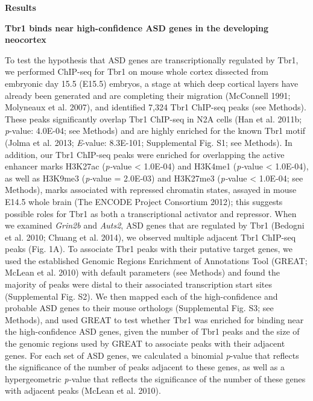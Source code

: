 \documentclass[]{article}
\begin{document}
\textbf{Results}

\textbf{Tbr1 binds near high-confidence ASD genes in the developing
neocortex}

To test the hypothesis that ASD genes are transcriptionally regulated by
Tbr1, we performed ChIP-seq for Tbr1 on mouse whole cortex dissected
from embryonic day 15.5 (E15.5) embryos, a stage at which deep cortical
layers have already been generated and are completing their migration
(McConnell 1991; Molyneaux et al. 2007), and identified 7,324 Tbr1
ChIP-seq peaks (see Methods). These peaks significantly overlap Tbr1
ChIP-seq in N2A cells (Han et al. 2011b; \emph{p}-value: 4.0E-04; see
Methods) and are highly enriched for the known Tbr1 motif (Jolma et al.
2013; \emph{E}-value: 8.3E-101; Supplemental Fig. S1; see Methods). In
addition, our Tbr1 ChIP-seq peaks were enriched for overlapping the
active enhancer marks H3K27ac (\emph{p-}value \textless{} 1.0E-04) and
H3K4me1 (\emph{p-}value \textless{} 1.0E-04), as well as H3K9me3
(\emph{p-}value = 2.0E-03) and H3K27me3 (\emph{p-}value \textless{}
1.0E-04; see Methods), marks associated with repressed chromatin states,
assayed in mouse E14.5 whole brain (The ENCODE Project Consortium 2012);
this suggests possible roles for Tbr1 as both a transcriptional
activator and repressor. When we examined \emph{Grin2b} and
\emph{Auts2}, ASD genes that are regulated by Tbr1 (Bedogni et al. 2010;
Chuang et al. 2014), we observed multiple adjacent Tbr1 ChIP-seq peaks
(Fig. 1A). To associate Tbr1 peaks with their putative target genes, we
used the established Genomic Regions Enrichment of Annotations Tool
(GREAT; McLean et al. 2010) with default parameters (see Methods) and
found the majority of peaks were distal to their associated
transcription start sites (Supplemental Fig. S2). We then mapped each of
the high-confidence and probable ASD genes to their mouse orthologs
(Supplemental Fig. S3; see Methods), and used GREAT to test whether Tbr1
was enriched for binding near the high-confidence ASD genes, given the
number of Tbr1 peaks and the size of the genomic regions used by GREAT
to associate peaks with their adjacent genes. For each set of ASD genes,
we calculated a binomial \emph{p}-value that reflects the significance
of the number of peaks adjacent to these genes, as well as a
hypergeometric \emph{p-}value that reflects the significance of the
number of these genes with adjacent peaks (McLean et al. 2010).
\end{document}
